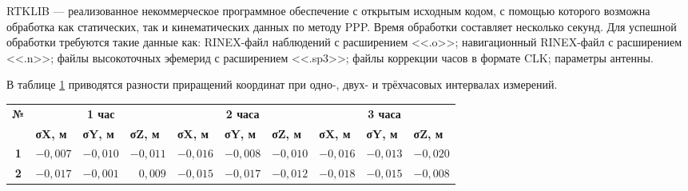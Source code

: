 RTKLIB --- реализованное некоммерческое программное обеспечение с открытым исходным кодом, с помощью которого возможна обработка как статических, так и кинематических данных по методу PPP. Время обработки составляет несколько секунд. Для успешной обработки требуются такие данные как: RINEX-файл наблюдений с расширением <<.o>>; навигационный RINEX-файл с расширением <<.n>>; файлы высокоточных эфемерид с расширением <<.sp3>>; файлы коррекции часов в формате CLK; параметры антенны.

В таблице \cref{tab:tab13} приводятся разности приращений координат при одно-, двух- и трёхчасовых интервалах измерений.


\begin{table} [htbp]
	\centering\small
	\label{tab:tab13}{%
		\begin{tabular}{|c|rrr|rrr|rrr|}
			\hline
			\multirow{2}{*}{\textbf{№}} & 
			\multicolumn{3}{c|}{\textbf{1 час}}                                                                             & \multicolumn{3}{c|}{\textbf{2 часа}}                                                                            & \multicolumn{3}{c|}{\textbf{3 часа}}                                                                            \\ \cline{2-10} 
			& \multicolumn{1}{l|}{\textbf{σX, м}} & \multicolumn{1}{l|}{\textbf{σY, м}} & \multicolumn{1}{l|}{\textbf{σZ, м}} & \multicolumn{1}{l|}{\textbf{σX, м}} & \multicolumn{1}{l|}{\textbf{σY, м}} & \multicolumn{1}{l|}{\textbf{σZ, м}} & \multicolumn{1}{l|}{\textbf{σX, м}} & \multicolumn{1}{l|}{\textbf{σY, м}} & \multicolumn{1}{l|}{\textbf{σZ, м}} \\ \hline
			\textbf{1}                  		& 
			\multicolumn{1}{r|}{$-0,007$}       & \multicolumn{1}{r|}{$-0,010$}       & $-0,011$                            & \multicolumn{1}{r|}{$-0,016$}       & \multicolumn{1}{r|}{$-0,008$}       & $-0,010$                            & \multicolumn{1}{r|}{$-0,016$}       & \multicolumn{1}{r|}{$-0,013$}       & $-0,020$                            \\ \hline
			\textbf{2}                  		& 
			\multicolumn{1}{r|}{$-0,017$}       & \multicolumn{1}{r|}{$-0,001$}       & $ 0,009$                            & \multicolumn{1}{r|}{$-0,015$}       & \multicolumn{1}{r|}{$-0,017$}       & $-0,012$                            & \multicolumn{1}{r|}{$-0,018$}       & \multicolumn{1}{r|}{$-0,015$}       & $-0,008$                            \\ \hline

\end{tabular}}
\end{table}
